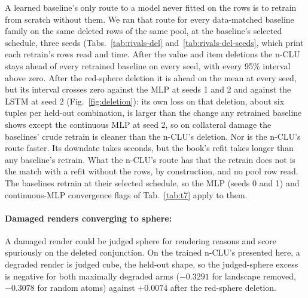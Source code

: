 \documentclass{article} %
\begin{document}
A learned baseline's only route to a model never fitted on the rows is to retrain from scratch without them. We ran
that route for every data-matched baseline family on the same deleted rows of the same %
pool, at the baseline's selected schedule, three seeds (Tabs.~\ref{tab:rivals-del}
and~\ref{tab:rivals-del-seeds}, which print each retrain's rows read %
and time. After the value and item deletions the n-CLU stays ahead of every %
retrained baseline on every seed, with every 95\% interval above %
zero. After the red-sphere deletion it is ahead on the mean at every seed, but its interval crosses
zero against the MLP at seeds 1 and 2 and against the LSTM at seed 2 (Fig.~\ref{fig:deletion}): %
its own loss on that deletion, about six tuples per held-out combination, is larger than the %
change any retrained baseline shows except the continuous MLP at seed 2, so on %
collateral damage the baselines' crude retrain is cleaner than the n-CLU's deletion. Nor is the
n-CLU's route faster. Its downdate takes seconds, but the book's refit takes longer %
than any baseline's retrain. What the n-CLU's route has that the retrain does not %
is the match with a refit without the rows, by construction, and no pool row read. The baselines
retrain at their selected schedule, so the MLP (seeds 0 and 1) and continuous-MLP convergence flags
of Tab.~\ref{tab:t7} apply to them.

\paragraph{Damaged renders converging to sphere:} A damaged render could be judged sphere for rendering
reasons and score spuriously on the deleted conjunction. On the trained n-CLU's presented here, a degraded render
is judged cube, the held-out shape, so the judged-sphere excess is negative for both maximally
degraded arms ($-0.3291$ for landscape removed, $-0.3078$ for
random atoms) against $+0.0074$ after the red-sphere deletion.
\end{document}
